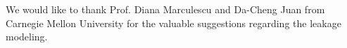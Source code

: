 We would like to thank Prof. Diana Marculescu and Da-Cheng Juan from Carnegie Mellon University for the valuable suggestions regarding the leakage modeling.
